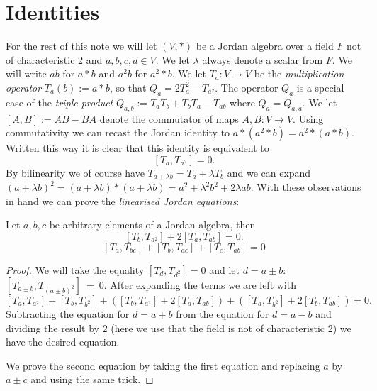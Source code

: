 \documentclass{article}
\begin{document}
\section{Identities}
For the rest of this note we will let $(V,*)$ be a Jordan algebra over a field $F$ not of characteristic 2 and $a,b,c,d\in V$. We let $\lambda$ always denote a scalar from $F$. We will write $ab$ for $a*b$ and $a^2b$ for $a^2*b$. We let $T_a:V\rightarrow V$ be the \emph{multiplication operator} $T_a(b):= a*b$, so that $Q_a = 2T_a^2 - T_{a^2}$. The operator $Q_a$ is a special case of the \emph{triple product} $Q_{a,b}:= T_aT_b + T_bT_a -T_{ab}$ where $Q_a = Q_{a,a}$. We let $[A,B]:= AB-BA$ denote the commutator of maps $A,B:V\rightarrow V$. Using commutativity we can recast the Jordan identity to $a*(a^2*b) = a^2*(a*b)$. Written this way it is clear that this identity is equivalent to
\begin{equation}\label{eq:jordan}
	[T_a,T_{a^2}]=0.
\end{equation}
By bilinearity we of course have $T_{a+\lambda b} = T_a + \lambda T_b$ and we can expand $(a+\lambda b)^2 = (a+\lambda b)*(a+\lambda b) = a^2 + \lambda^2 b^2 + 2\lambda ab$. With these observations in hand we can prove the \emph{linearised Jordan equations}:
\begin{lemma}
	Let $a,b,c$ be arbitrary elements of a Jordan algebra, then 
	\begin{equation}\label{eq:linjordan1}
		[T_b, T_{a^2}] + 2[T_a, T_{ab}] = 0.
	\end{equation}
	\begin{equation}\label{eq:linjordan2}
		[T_a,T_{bc}] + [T_b, T_{ac}] + [T_c, T_{ab}] = 0
	\end{equation}
\end{lemma}
\begin{proof}
	We will take the equality $[T_d,T_{d^2}] = 0$ and let $d=a\pm b$: $[T_{a\pm b},T_{(a\pm b)^2}]~=~0$. After expanding the terms we are left with
	$$[T_a, T_{a^2}] \pm [T_b, T_{b^2}] \pm \left([T_b, T_{a^2}] + 2 [T_a, T_{ab}]\right) +\left([T_a, T_{b^2}] + 2 [T_b, T_{ab}]\right) = 0.$$
	Subtracting the equation for $d=a+b$ from the equation for $d=a-b$ and dividing the result by 2 (here we use that the field is not of characteristic 2) we have the desired equation.

	We prove the second equation by taking the first equation and replacing $a$ by $a\pm c$ and using the same trick.
\end{proof}
\end{document}
